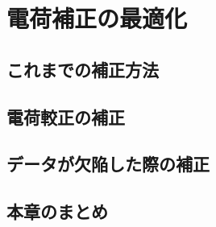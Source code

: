 \chapter{電荷補正の最適化}
\label{sec:chap4}

\section{これまでの補正方法}
\label{sec:}

\section{電荷較正の補正}
\label{sec:}


\section{データが欠陥した際の補正}
\label{sec:}


\section{本章のまとめ}
\label{sec:}





\newpage
